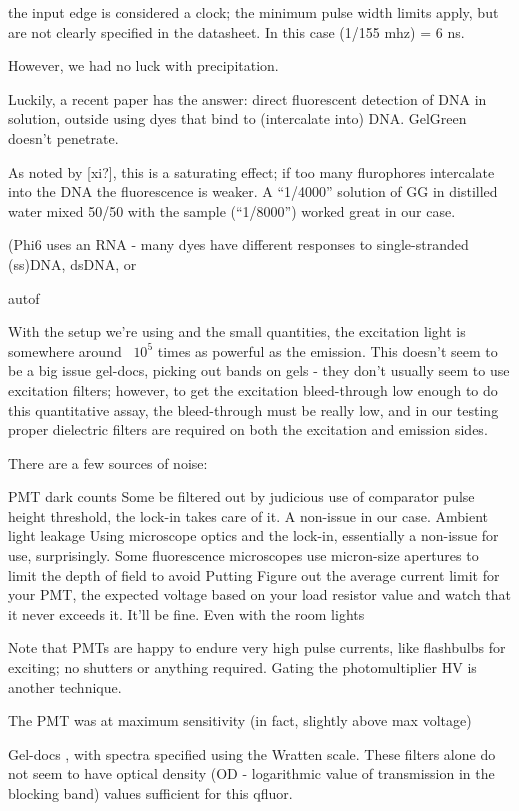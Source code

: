 \documentclass[paper.tex]{subfiles}
\begin{document}
the input edge is considered a clock; the minimum pulse width limits apply, but are not clearly specified in the datasheet. In this case (1/155 mhz) = 6 ns.

However, we had no luck with precipitation.


Luckily, a recent paper has the answer: direct fluorescent detection of DNA in solution, outside using dyes that bind to (intercalate into) DNA. GelGreen doesn’t penetrate.



As noted by [xi?], this is a saturating effect; if too many flurophores intercalate into the DNA the fluorescence is weaker. A “1/4000” solution of GG in distilled water mixed 50/50 with the sample (“1/8000”) worked great in our case.

(Phi6 uses an RNA - many dyes have different responses to single-stranded (ss)DNA, dsDNA, or 


autof


With the setup we’re using and the small quantities, the excitation light is somewhere around ~$10^5$ times as powerful as the emission. This doesn’t seem to be a big issue gel-docs, picking out bands on gels - they don’t usually seem to use excitation filters; however, to get the excitation bleed-through low enough to do this quantitative assay, the bleed-through must be really low, and in our testing proper dielectric filters are required on both the excitation and emission sides. 

There are a few sources of noise:

PMT dark counts
Some be filtered out by judicious use of comparator pulse height threshold, the lock-in takes care of it. A non-issue in our case.
Ambient light leakage
Using microscope optics and the lock-in, essentially a non-issue for use, surprisingly. Some fluorescence microscopes use micron-size apertures to limit the depth of field to avoid Putting 
Figure out the average current limit for your PMT, the expected voltage based on your load resistor value and watch that it never exceeds it. It’ll be fine. Even with the room lights


Note that PMTs are happy to endure very high pulse currents, like flashbulbs for exciting; no shutters or anything required. Gating the photomultiplier HV is another technique.


The PMT was at maximum sensitivity (in fact, slightly above max voltage)

Gel-docs , with spectra specified using the Wratten scale. These filters alone do not seem to have optical density (OD - logarithmic value of transmission in the blocking band) values sufficient for this qfluor. 
\end{document}
